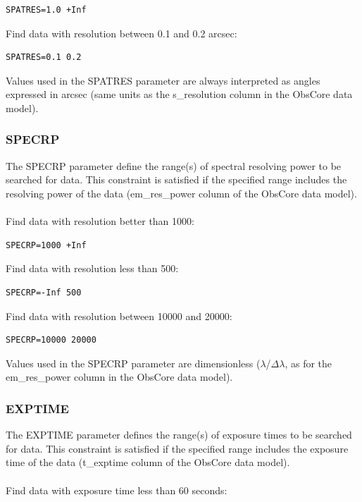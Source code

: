 \documentclass[11pt,a4paper]{ivoa}
\begin{document}
\begin{lstlisting}
SPATRES=1.0 +Inf 
\end{lstlisting}
Find data with resolution between 0.1 and 0.2 arcsec:

\begin{lstlisting}
SPATRES=0.1 0.2
\end{lstlisting}

Values used in the SPATRES parameter are always interpreted as angles expressed in arcsec (same units as the s\_resolution column in the ObsCore data model).

\subsubsection{SPECRP}

The SPECRP parameter define the range(s) of spectral resolving power to be searched for data. This constraint is satisfied if the specified range includes the resolving power of the data (em\_res\_power column of the ObsCore data model). \\ \\
Find data with resolution better than 1000:

\begin{lstlisting}
SPECRP=1000 +Inf
\end{lstlisting}
Find data with resolution less than 500:

\begin{lstlisting}
SPECRP=-Inf 500
\end{lstlisting}
Find data with resolution between 10000 and 20000:

\begin{lstlisting}
SPECRP=10000 20000
\end{lstlisting}


Values used in the SPECRP parameter are dimensionless ($\lambda$/$\Delta$$\lambda$, as for the em\_res\_power column in the ObsCore data model).

\subsubsection{EXPTIME}

The EXPTIME parameter defines the range(s) of exposure times to be searched for data. This constraint is satisfied if the specified range includes the exposure time of the data (t\_exptime column of the ObsCore  data model). \\ \\
Find data with exposure time less than  60 seconds:
\end{document}
